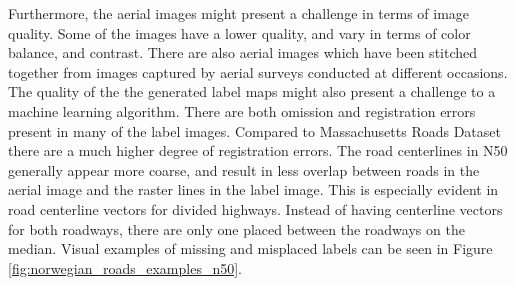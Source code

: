 Furthermore, the aerial images might present a challenge in terms of image quality. Some of the images have a lower quality, and vary in terms of color balance, and contrast. There are also aerial images which have been stitched together from images captured by aerial surveys conducted at different occasions.\\

The quality of the the generated label maps might also present a challenge to a machine learning algorithm. There are both omission and registration errors present in many of the label images. Compared to Massachusetts Roads Dataset there are a much higher degree of registration errors. The road centerlines in N50 generally appear more coarse, and result in less overlap between roads in the aerial image and the raster lines in the label image. This is especially evident in road centerline vectors for divided highways. Instead of having centerline vectors for both roadways, there are only one placed between the roadways on the median. Visual examples of missing and misplaced labels can be seen in Figure \ref{fig:norwegian_roads_examples_n50}.\\

